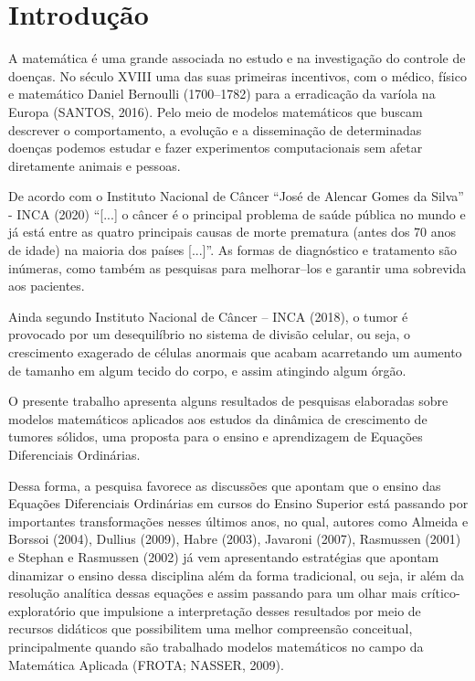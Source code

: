 \section{Introdução}

A matemática é uma grande associada no estudo e na investigação do controle de doenças. No século XVIII uma das suas primeiras incentivos, com o médico, físico e matemático Daniel Bernoulli (1700--1782) para a erradicação da varíola na Europa (SANTOS, 2016). Pelo meio de modelos matemáticos que buscam descrever o comportamento, a evolução e a disseminação de determinadas doenças podemos estudar e fazer experimentos computacionais sem afetar diretamente animais e pessoas.

De acordo com o Instituto Nacional de Câncer ``José de Alencar Gomes da Silva'' - INCA (2020) ``[...] o câncer é o principal problema de saúde pública no mundo e já está entre as quatro principais causas de morte prematura (antes dos 70 anos de idade) na maioria dos países [...]''. As formas de diagnóstico e tratamento são inúmeras, como também as pesquisas para melhorar--los e garantir uma sobrevida aos pacientes.

Ainda segundo Instituto Nacional de Câncer – INCA (2018), o tumor é provocado por um desequilíbrio no sistema de divisão celular, ou seja, o crescimento exagerado de células anormais que acabam acarretando um aumento de tamanho em algum tecido do corpo, e assim atingindo algum órgão.

O presente trabalho apresenta alguns resultados de pesquisas elaboradas sobre modelos matemáticos aplicados aos estudos da dinâmica de crescimento de tumores sólidos, uma proposta para o ensino e aprendizagem de Equações Diferenciais Ordinárias.

Dessa forma, a pesquisa favorece as discussões que apontam que o ensino das Equações
Diferenciais Ordinárias em cursos do Ensino Superior está passando por importantes
transformações nesses últimos anos, no qual, autores como Almeida e Borssoi (2004), Dullius (2009), Habre (2003), Javaroni (2007), Rasmussen (2001) e Stephan e Rasmussen (2002) já vem apresentando estratégias que apontam dinamizar o ensino dessa disciplina além da forma tradicional, ou seja, ir além da resolução analítica dessas equações e assim passando para um olhar mais crítico-exploratório que impulsione a interpretação desses resultados por meio de recursos didáticos que possibilitem uma melhor compreensão conceitual, principalmente quando são trabalhado modelos matemáticos no campo da Matemática Aplicada (FROTA; NASSER, 2009).

